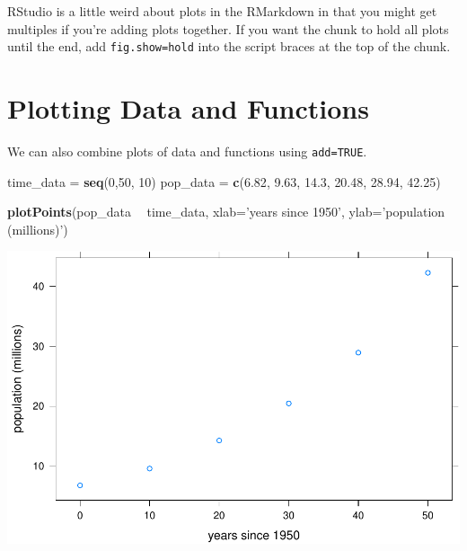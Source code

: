 \documentclass[
]{book}
\newenvironment{Shaded}{\begin{snugshade}}{\end{snugshade}}
\newcommand{\DataTypeTok}[1]{\textcolor[rgb]{0.13,0.29,0.53}{#1}}
\newcommand{\DecValTok}[1]{\textcolor[rgb]{0.00,0.00,0.81}{#1}}
\newcommand{\FloatTok}[1]{\textcolor[rgb]{0.00,0.00,0.81}{#1}}
\newcommand{\KeywordTok}[1]{\textcolor[rgb]{0.13,0.29,0.53}{\textbf{#1}}}
\newcommand{\NormalTok}[1]{#1}
\newcommand{\OperatorTok}[1]{\textcolor[rgb]{0.81,0.36,0.00}{\textbf{#1}}}
\newcommand{\StringTok}[1]{\textcolor[rgb]{0.31,0.60,0.02}{#1}}
\begin{document}
RStudio is a little weird about plots in the RMarkdown in that you might get multiples if you're adding plots together. If you want the chunk to hold all plots until the end, add \texttt{fig.show=\textquotesingle{}hold\textquotesingle{}} into the script braces at the top of the chunk.

\hypertarget{plotting-data-and-functions}{%
\section{Plotting Data and Functions}\label{plotting-data-and-functions}}

We can also combine plots of data and functions using \texttt{add=TRUE}.

\begin{Shaded}
\begin{Highlighting}[]
\NormalTok{time_data =}\StringTok{ }\KeywordTok{seq}\NormalTok{(}\DecValTok{0}\NormalTok{,}\DecValTok{50}\NormalTok{, }\DecValTok{10}\NormalTok{)}
\NormalTok{pop_data =}\StringTok{ }\KeywordTok{c}\NormalTok{(}\FloatTok{6.82}\NormalTok{, }\FloatTok{9.63}\NormalTok{, }\FloatTok{14.3}\NormalTok{, }\FloatTok{20.48}\NormalTok{, }\FloatTok{28.94}\NormalTok{, }\FloatTok{42.25}\NormalTok{)}

\KeywordTok{plotPoints}\NormalTok{(pop_data }\OperatorTok{~}\StringTok{ }\NormalTok{time_data, }\DataTypeTok{xlab=}\StringTok{'years since 1950'}\NormalTok{, }\DataTypeTok{ylab=}\StringTok{'population (millions)'}\NormalTok{)}
\end{Highlighting}
\end{Shaded}

\includegraphics{_bookdown_files/math135_handbook_files/figure-latex/unnamed-chunk-34-1.pdf}
\end{document}
